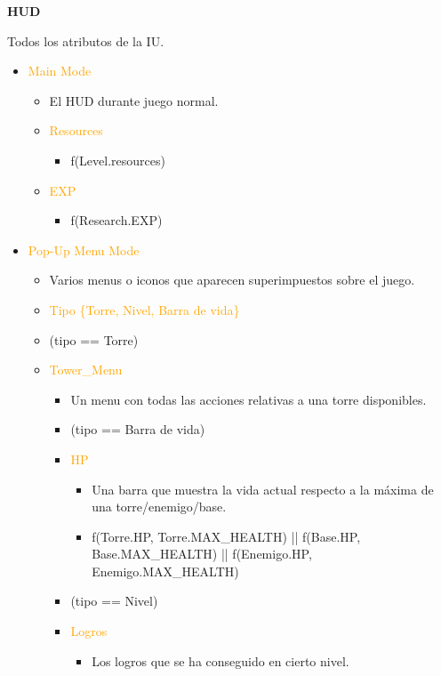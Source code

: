 \documentclass{article}
\begin{document}
\clearpage

\noindent \textbf{HUD}

\hfill \break \noindent Todos los atributos de la IU.

\begin{itemize}
    \item \textcolor{Orange}{Main Mode}
    \begin{itemize}
		\item El HUD durante juego normal.
		\item \textcolor{Orange}{Resources}
		\begin{itemize}
			\item f(Level.resources)
		\end{itemize}
		\item \textcolor{Orange}{EXP}
		\begin{itemize}
			\item f(Research.EXP)
		\end{itemize}
    \end{itemize}
    \item \textcolor{Orange}{Pop-Up Menu Mode}
    \begin{itemize}
        \item Varios menus o iconos que aparecen superimpuestos sobre el juego.
		\item \textcolor{Orange}{Tipo \{Torre, Nivel, Barra de vida\}}
		\item (tipo == Torre)
		\item \textcolor{Orange}{Tower\_Menu}
		\begin{itemize}
			\item Un menu con todas las acciones relativas a una torre disponibles.
			\item (tipo == Barra de vida)
			\item \textcolor{Orange}{HP}
		    \begin{itemize}
			    \item Una barra que muestra la vida actual respecto a la máxima de una torre/enemigo/base.
			    \item f(Torre.HP, Torre.MAX\_HEALTH) || f(Base.HP, Base.MAX\_HEALTH) || f(Enemigo.HP, Enemigo.MAX\_HEALTH)
		    \end{itemize}
		    \item (tipo == Nivel)
		    \item \textcolor{Orange}{Logros}
		    \begin{itemize}
			    \item Los logros que se ha conseguido en cierto nivel.

\end{itemize}
\end{itemize}
\end{itemize}
\end{itemize}
\end{document}
